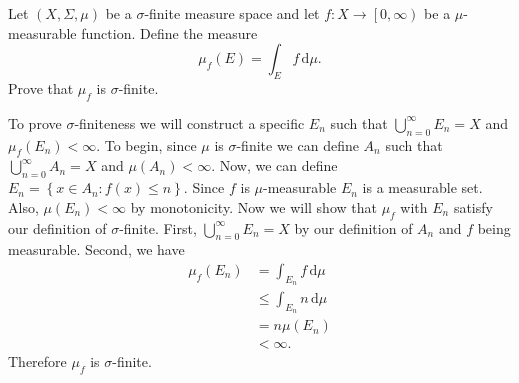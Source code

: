 
\begin{problem}{1}
  Let $\left( X, \Sigma, \mu \right)$ be a $\sigma$-finite measure space and let $f : X \to \left[ 0, \infty \right) $ be a $\mu$-measurable function.
  Define the measure
  \[
  \mu_{f}\left( E \right) = \int_{E} \! f \, \mathrm{d}\mu 
  .\] 
  Prove that $\mu_{f}$ is $\sigma$-finite.
\end{problem}

\begin{solution}
To prove $\sigma$-finiteness we will construct a specific $E_{n}$ such that $\bigcup_{n=0}^{\infty} E_{n} = X$ and $\mu_{f}\left( E_{n} \right) < \infty$.
To begin, since $\mu$ is $\sigma$-finite we can define $A_{n}$ such that $\bigcup_{n=0}^{\infty} A_{n} = X$ and $\mu\left( A_{n} \right) < \infty$.
Now, we can define $E_{n} = \left\{ x \in A_{n} : f\left( x \right) \leq n \right\}$.
Since $f$ is $\mu$-measurable $E_{n}$ is a measurable set.
Also, $\mu\left( E_{n} \right) < \infty$ by monotonicity.
Now we will show that $\mu_{f}$ with $E_{n}$ satisfy our definition of $\sigma$-finite.
First, $\bigcup_{n=0}^{\infty} E_{n} = X $ by our definition of $ A_{n}$ and $f$ being measurable.
Second, we have
\begin{align*}
  \mu_{f}\left( E_{n} \right) &= \int_{E_{n}} \! f \, \mathrm{d}\mu \\
                              &\leq \int_{E_{n}} \! n \, \mathrm{d}\mu \\
                              &= n \mu\left( E_{n} \right) \\
                              &< \infty
.\end{align*}
Therefore $\mu_{f}$ is $\sigma$-finite.
\end{solution}
